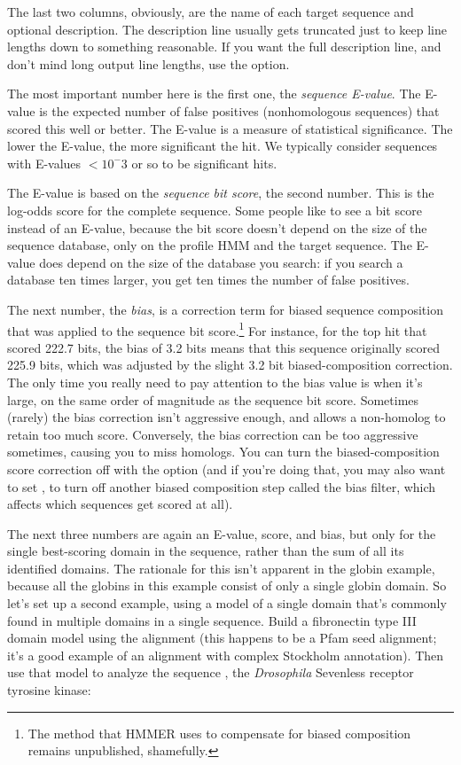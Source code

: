 The last two columns, obviously, are the name of each target sequence
and optional description. The description line usually gets truncated
just to keep line lengths down to something reasonable. If you want
the full description line, and don't mind long output line lengths,
use the  option.

The most important number here is the first one, the \emph{sequence
  E-value}. The E-value is the expected number of false positives
(nonhomologous sequences) that scored this well or better.  The
E-value is a measure of statistical significance. The lower the
E-value, the more significant the hit.  We typically consider
sequences with E-values $< 10^-3$ or so to be significant hits.

The E-value is based on the \emph{sequence bit score}, the second
number. This is the log-odds score for the complete sequence.  Some
people like to see a bit score instead of an E-value, because the bit
score doesn't depend on the size of the sequence database, only on the
profile HMM and the target sequence. The E-value does depend on the
size of the database you search: if you search a database ten times
larger, you get ten times the number of false positives.

The next number, the \emph{bias}, is a correction term for biased
sequence composition that was applied to the sequence bit
score.\footnote{The method that HMMER uses to compensate for biased
  composition remains unpublished, shamefully.}
For instance, for the top hit
 that scored 222.7 bits, the bias of 3.2 bits means
that this sequence originally scored 225.9 bits, which was adjusted by
the slight 3.2 bit biased-composition correction. The only time you
really need to pay attention to the bias value is when it's large, on
the same order of magnitude as the sequence bit score. Sometimes
(rarely) the bias correction isn't aggressive enough, and allows a
non-homolog to retain too much score. Conversely, the bias correction
can be too aggressive sometimes, causing you to miss homologs. You can
turn the biased-composition score correction off with the
 option (and if you're doing that, you may also want
to set , to turn off another biased composition step
called the bias filter, which affects which sequences get scored at
all).

The next three numbers are again an E-value, score, and bias, but only
for the single best-scoring domain in the sequence, rather than the
sum of all its identified domains. The rationale for this isn't
apparent in the globin example, because all the globins in this
example consist of only a single globin domain. So let's set up a
second example, using a model of a single domain that's commonly found
in multiple domains in a single sequence. Build a fibronectin type III
domain model using the  alignment (this happens
to be a Pfam seed alignment; it's a good example of an alignment with
complex Stockholm annotation). Then use that model to analyze the
sequence , the \emph{Drosophila} Sevenless
receptor tyrosine kinase:


